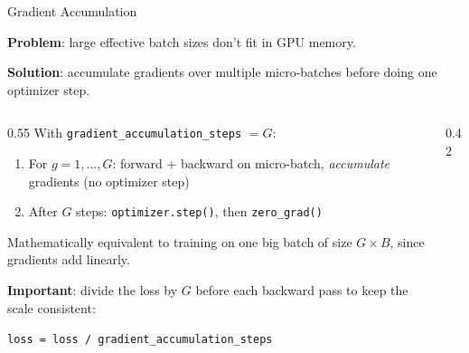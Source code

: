 \begin{frame}{Gradient Accumulation}

  \textbf{Problem}: large effective batch sizes don't fit in GPU memory.

  \vspace{0.5em}
  \textbf{Solution}: accumulate gradients over multiple micro-batches before doing one optimizer step.

  \vspace{0.5em}
  \begin{columns}
    \begin{column}{0.55\textwidth}
      With \texttt{gradient\_accumulation\_steps} $= G$:
      \begin{enumerate}
        \item For $g = 1, \ldots, G$: forward + backward on micro-batch, \emph{accumulate} gradients (no optimizer step)
        \item After $G$ steps: \texttt{optimizer.step()}, then \texttt{zero\_grad()}
      \end{enumerate}

      \vspace{0.4em}
      Mathematically equivalent to training on one big batch of size $G \times B$, since gradients add linearly.

      \vspace{0.3em}
      \textbf{Important}: divide the loss by $G$ before each backward pass to keep the scale consistent:
      \begin{center}
        \texttt{loss = loss / gradient\_accumulation\_steps}
      \end{center}
    \end{column}
    \begin{column}{0.42\textwidth}
    \end{column}
  \end{columns}
\end{frame}

